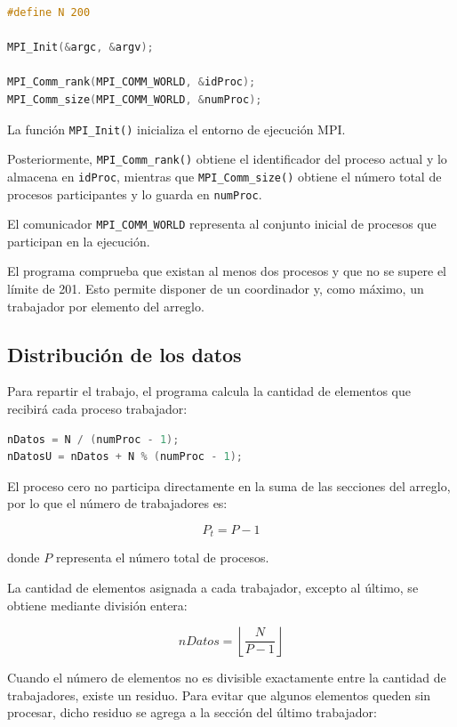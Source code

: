 \documentclass[12pt,a4paper]{article}
\begin{document}
\begin{lstlisting}[language=C]
#define N 200

MPI_Init(&argc, &argv);

MPI_Comm_rank(MPI_COMM_WORLD, &idProc);
MPI_Comm_size(MPI_COMM_WORLD, &numProc);
\end{lstlisting}

La función \texttt{MPI\_Init()} inicializa el entorno de ejecución MPI.

Posteriormente, \texttt{MPI\_Comm\_rank()} obtiene el identificador del proceso actual y lo almacena en \texttt{idProc}, mientras que \texttt{MPI\_Comm\_size()} obtiene el número total de procesos participantes y lo guarda en \texttt{numProc}.

El comunicador \texttt{MPI\_COMM\_WORLD} representa al conjunto inicial de procesos que participan en la ejecución.

El programa comprueba que existan al menos dos procesos y que no se supere el límite de 201. Esto permite disponer de un coordinador y, como máximo, un trabajador por elemento del arreglo.

\subsection{Distribución de los datos}

Para repartir el trabajo, el programa calcula la cantidad de elementos que recibirá cada proceso trabajador:

\begin{lstlisting}[language=C]
nDatos = N / (numProc - 1);
nDatosU = nDatos + N % (numProc - 1);
\end{lstlisting}

El proceso cero no participa directamente en la suma de las secciones del arreglo, por lo que el número de trabajadores es:

\[
P_t = P - 1
\]

donde \(P\) representa el número total de procesos.

La cantidad de elementos asignada a cada trabajador, excepto al último, se obtiene mediante división entera:

\[
nDatos = \left\lfloor \frac{N}{P-1} \right\rfloor
\]

Cuando el número de elementos no es divisible exactamente entre la cantidad de trabajadores, existe un residuo. Para evitar que algunos elementos queden sin procesar, dicho residuo se agrega a la sección del último trabajador:
\end{document}
